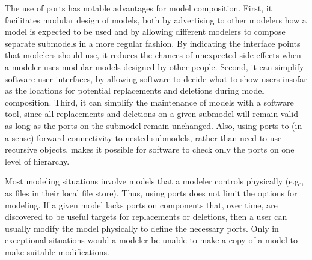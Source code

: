 The use of ports has notable advantages for model composition.  First, it facilitates modular design of models, both by advertising to other modelers how a model is expected to be used and by allowing different modelers to compose separate submodels in a more regular fashion.  By indicating the interface points that modelers should use, it reduces the chances of unexpected side-effects when a modeler uses modular models designed by other people.  Second, it can simplify software user interfaces, by allowing software to decide what to show users insofar as the locations for potential replacements and deletions during model composition.  Third, it can simplify the maintenance of models with a software tool, since all replacements and deletions on a given submodel will remain valid as long as the ports on the submodel remain unchanged. Also, using ports to (in a sense) forward connectivity to nested submodels, rather than need to use recursive \SBaseRef objects, makes it possible for software to check only the ports on one level of hierarchy.

Most modeling situations involve models that a modeler controls physically (e.g., as files in their local file store).  Thus, using ports does not limit the options for modeling.  If a given model lacks ports on components that, over time, are discovered to be useful targets for replacements or deletions, then a user can usually modify the model physically to define the necessary ports.  Only in exceptional situations would a modeler be unable to make a copy of a model to make suitable modifications.


%



